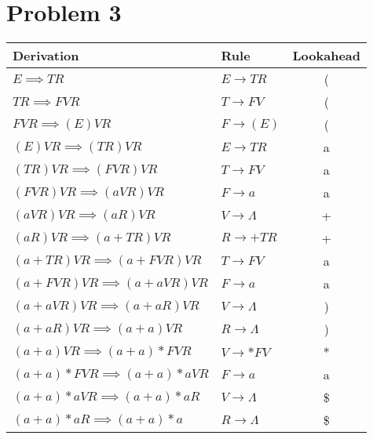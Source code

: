 \documentclass[12pt]{article}
\begin{document}
\pagebreak
\section*{Problem 3}

\begin{tabular}{llc}
\textbf{Derivation} & \textbf{Rule} & \textbf{Lookahead} \\
\hline
\(E \implies TR\) & \(E \rightarrow TR\) & ( \\
\(TR \implies FVR\) & \(T \rightarrow FV\) & ( \\
\(FVR \implies (E)VR\) & \(F \rightarrow (E)\) & ( \\
\((E)VR \implies (TR)VR\) & \(E \rightarrow TR\) & a \\
\((TR)VR \implies (FVR)VR\) & \(T \rightarrow FV\) & a \\
\((FVR)VR \implies (aVR)VR\) & \(F \rightarrow a\) & a \\
\((aVR)VR \implies (aR)VR\) & \(V \rightarrow \Lambda\) & + \\
\((aR)VR \implies (a+TR)VR\) & \(R \rightarrow +TR\) & + \\
\((a+TR)VR \implies (a+FVR)VR\) & \(T \rightarrow FV\) & a \\
\((a+FVR)VR \implies (a+aVR)VR\) & \(F \rightarrow a\) & a \\
\((a+aVR)VR \implies (a+aR)VR\) & \(V \rightarrow \Lambda\) & ) \\
\((a+aR)VR \implies (a+a)VR\) & \(R \rightarrow \Lambda\) & ) \\
\((a+a)VR \implies (a+a)*FVR\) & \(V \rightarrow *FV\) & * \\
\((a+a)*FVR \implies (a+a)*aVR\) & \(F \rightarrow a\) & a \\
\((a+a)*aVR \implies (a+a)*aR\) & \(V \rightarrow \Lambda\) & \$ \\
\((a+a)*aR \implies (a+a)*a\) & \(R \rightarrow \Lambda\) & \$ \\
\end{tabular}
\end{document}
